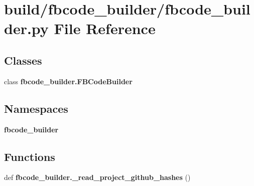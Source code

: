 \section{build/fbcode\+\_\+builder/fbcode\+\_\+builder.py File Reference}
\label{fbcode__builder_8py}
\subsection*{Classes}
\begin{DoxyCompactItemize}
\item 
class {\bf fbcode\+\_\+builder.\+F\+B\+Code\+Builder}
\end{DoxyCompactItemize}
\subsection*{Namespaces}
\begin{DoxyCompactItemize}
\item 
 {\bf fbcode\+\_\+builder}
\end{DoxyCompactItemize}
\subsection*{Functions}
\begin{DoxyCompactItemize}
\item 
def {\bf fbcode\+\_\+builder.\+\_\+read\+\_\+project\+\_\+github\+\_\+hashes} ()
\end{DoxyCompactItemize}
